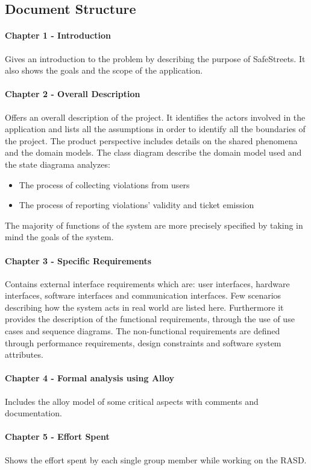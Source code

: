 \documentclass{article}
\begin{document}
\subsection{Document Structure}
\paragraph{Chapter 1 - Introduction}
Gives an introduction to the problem by describing the purpose of SafeStreets.
It also shows the goals and the scope of the application. \paragraph{Chapter 2 -
Overall Description}Offers an overall description of the project. It identifies
the actors involved in the application and lists all the assumptions in order to
identify all the boundaries of the project. The product perspective includes
details on the shared phenomena and the domain models. The class diagram
describe the domain model used and the state diagrama analyzes:
\begin{itemize}
    \item The process of collecting violations from users
    \item The process of reporting violations' validity and ticket emission
\end{itemize}
The majority of functions of the system are more precisely specified by taking
in mind the goals of the system.  
\paragraph{Chapter 3 - Specific Requirements}
Contains external interface requirements which are: user interfaces, hardware
interfaces, software interfaces and communication interfaces. Few scenarios
describing how the system acts in real world are listed here. Furthermore it
provides the description of the functional requirements, through the use of use
cases and sequence diagrams. The non-functional requirements are defined through
performance requirements, design constraints and software system attributes.
\paragraph{Chapter 4 - Formal analysis using Alloy}
Includes the alloy model of some critical aspects with comments and
documentation.
\paragraph{Chapter 5 - Effort Spent}
Shows the effort spent by each single group member while working on the RASD.
\end{document}
